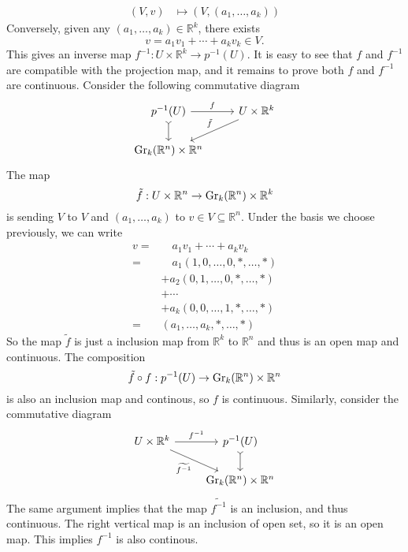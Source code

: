 \documentclass[letterpaper, 12pt]{article}
\begin{document}
\begin{solution}
\begin{align*}
     (V,v)&\mapsto (V,(a_1,\ldots,a_k))
\end{align*}
Conversely, given any \((a_1,\ldots, a_k)\in \mathbb{R}^k\), there exists 
\[v=a_1v_1+\cdots+a_kv_k\in V.\]
This gives an inverse map \(f^{-1}:U\times \mathbb{R}^k\rightarrow p^{-1}(U)\). It is easy to see that \(f\) and \(f^{-1}\) are compatible with the projection map, and it remains to prove both \(f\) and \(f^{-1}\) are continuous. Consider the following commutative diagram 
\[\begin{tikzcd}
	{p^{-1}(U)} & {U\times \mathbb{R}^k} \\
	{\text{Gr}_k(\mathbb{R}^n)\times \mathbb{R}^n}
	\arrow["f", from=1-1, to=1-2]
	\arrow[tail, from=1-1, to=2-1]
	\arrow["{\tilde{f}}"', from=1-2, to=2-1]
\end{tikzcd}\]
The map 
\[\tilde{f}:U\times \mathbb{R}^n\rightarrow \text{Gr}_k(\mathbb{R}^n)\times \mathbb{R}^k\] 
is sending \(V\) to \(V\) and \((a_1,\ldots, a_k)\) to \(v\in V\subseteq \mathbb{R}^n\). Under the basis we choose previously, we can write 
\begin{align*}
   v=&\quad a_1v_1+\cdots+a_kv_k\\ 
    =&\quad a_1(1,0,\ldots,0,*,\ldots,*)\\ 
     &+a_2(0,1,\ldots,0,*,\ldots,*)\\
     &+\cdots\\ 
     &+a_k(0,0,\ldots,1,*,\ldots,*)\\ 
    =&(a_1,\ldots,a_k,*,\ldots,*) 
\end{align*}
So the map \(\tilde{f}\) is just a inclusion map from \(\mathbb{R}^k\) to \(\mathbb{R}^n\) and thus is an open map and continuous. The composition 
\[\tilde{f}\circ f:p^{-1}(U)\rightarrow \text{Gr}_k(\mathbb{R}^n)\times \mathbb{R}^n\]
is also an inclusion map and continous, so \(f\) is continuous. Similarly, consider the commutative diagram 
\[\begin{tikzcd}
	{U\times \mathbb{R}^k} & {p^{-1}(U)} \\
	& {\text{Gr}_k(\mathbb{R}^n)\times \mathbb{R}^n}
	\arrow["{f^{-1}}", from=1-1, to=1-2]
	\arrow["{\widetilde{f^{-1}}}"', from=1-1, to=2-2]
	\arrow[tail, from=1-2, to=2-2]
\end{tikzcd}\]
The same argument implies that the map \(\widetilde{f^{-1}}\) is an inclusion, and thus continuous. The right vertical map is an inclusion of open set, so it is an open map. This implies \(f^{-1}\) is also continous. 
\end{solution}
\end{document}

